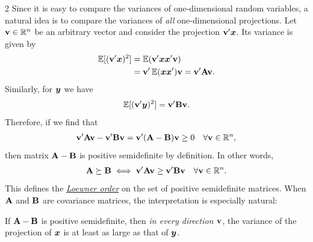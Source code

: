 \documentclass[a4paper]{article}
\begin{document}
\begin{multicols}{2}
Since it is easy to compare the variances of one-dimensional random variables,
a natural idea is to compare the variances of \emph{all} one-dimensional projections.
Let $\vv\in\reals^n$ be an arbitrary vector
and consider the projection $\vv\T\xx$.
Its variance is given by
\begin{align}
	\E[(\vv\T \xx)^2]
	&= \E(\vv\T \xx\xx\T\vv) \\
	&= \vv\T\E(\xx\xx\T)\vv
	= \vv\T \AA\vv.
\end{align}
Similarly, for $\yy$ we have
\begin{align}
	\E[(\vv\T \yy)^2]
	= \vv\T \BB\vv.
\end{align}
Therefore, if we find that
\begin{align}
	\vv\T \AA\vv - \vv\T \BB\vv
	= \vv\T (\AA - \BB)\vv
	\geq 0
	\quad\forall \vv\in\reals^n,
\end{align}
then matrix $\AA-\BB$ is positive semidefinite by definition.
In other words,
\begin{align}
	\AA \succeq \BB
	\iff
	\vv\T \AA\vv \geq \vv\T \BB\vv
	\quad\forall \vv\in\reals^n.
\end{align}
This defines the \href{https://en.wikipedia.org/wiki/Loewner_order}{\textit{Loewner order}}
on the set of positive semidefinite matrices.
When $\AA$ and $\BB$ are covariance matrices, the interpretation is especially natural:
\begin{tcolorbox}[enhanced,sharp corners,frame hidden,boxrule=0sp,borderline west={3pt}{0pt}{black!70}]
	If $\AA-\BB$ is positive semidefinite,
	then \emph{in every direction $\vv$},
	the variance of the projection of $\xx$ is at least as large as that of $\yy$.
\end{tcolorbox}


\end{multicols}
\end{document}
